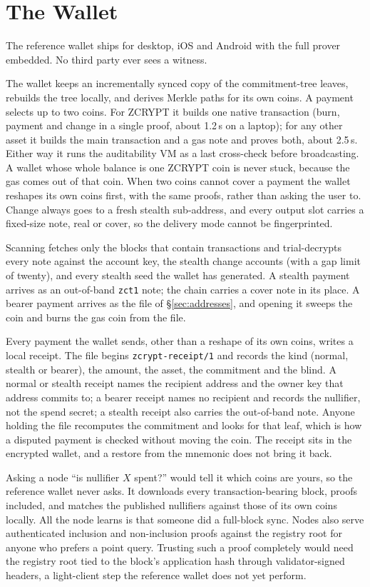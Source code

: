 \documentclass[twocolumn,10pt]{article}
\begin{document}
\section{The Wallet}
\label{sec:wallet}

The reference wallet ships for desktop, iOS and Android with the full prover embedded. No third party ever sees a witness.

The wallet keeps an incrementally synced copy of the commitment-tree leaves, rebuilds the tree locally, and derives Merkle paths for its own coins. A payment selects up to two coins. For ZCRYPT it builds one native transaction (burn, payment and change in a single proof, about 1.2\,s on a laptop); for any other asset it builds the main transaction and a gas note and proves both, about 2.5\,s. Either way it runs the auditability VM as a last cross-check before broadcasting. A wallet whose whole balance is one ZCRYPT coin is never stuck, because the gas comes out of that coin. When two coins cannot cover a payment the wallet reshapes its own coins first, with the same proofs, rather than asking the user to. Change always goes to a fresh stealth sub-address, and every output slot carries a fixed-size note, real or cover, so the delivery mode cannot be fingerprinted.

Scanning fetches only the blocks that contain transactions and trial-decrypts every note against the account key, the stealth change accounts (with a gap limit of twenty), and every stealth seed the wallet has generated. A stealth payment arrives as an out-of-band \texttt{zct1} note; the chain carries a cover note in its place. A bearer payment arrives as the file of \S\ref{sec:addresses}, and opening it sweeps the coin and burns the gas coin from the file.

Every payment the wallet sends, other than a reshape of its own coins, writes a local receipt. The file begins \texttt{zcrypt-receipt/1} and records the kind (normal, stealth or bearer), the amount, the asset, the commitment and the blind. A normal or stealth receipt names the recipient address and the owner key that address commits to; a bearer receipt names no recipient and records the nullifier, not the spend secret; a stealth receipt also carries the out-of-band note. Anyone holding the file recomputes the commitment and looks for that leaf, which is how a disputed payment is checked without moving the coin. The receipt sits in the encrypted wallet, and a restore from the mnemonic does not bring it back.

Asking a node ``is nullifier $X$ spent?'' would tell it which coins are yours, so the reference wallet never asks. It downloads every transaction-bearing block, proofs included, and matches the published nullifiers against those of its own coins locally. All the node learns is that someone did a full-block sync. Nodes also serve authenticated inclusion and non-inclusion proofs against the registry root for anyone who prefers a point query. Trusting such a proof completely would need the registry root tied to the block's application hash through validator-signed headers, a light-client step the reference wallet does not yet perform.
\end{document}
